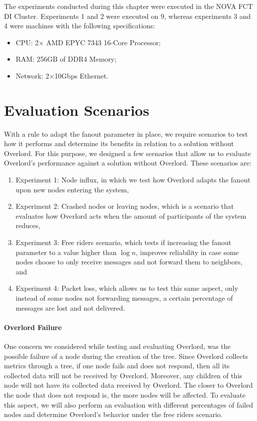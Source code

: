 The experiments conducted during this chapter were executed in the NOVA FCT DI Cluster. Experiments 1 and 2 were executed on 9, whereas experiments 3 and 4 were machines with the following specifications:
\begin{itemize}
    \item CPU: 2$\times$ AMD EPYC 7343 16-Core Processor;
    \item RAM: 256GB of DDR4 Memory;
    \item Network: 2$\times$10Gbps Ethernet.
\end{itemize}

\section{Evaluation Scenarios}
\label{sec:evaluation_scenarios}

With a rule to adapt the fanout parameter in place, we require scenarios to test how it performs and determine its benefits in relation to a solution without Overlord. For this purpose, we designed a few scenarios that allow us to evaluate Overlord's performance against a solution without Overlord. These scenarios are:
\begin{enumerate}[]
    \item Experiment 1: Node influx, in which we test how Overlord adapts the fanout upon new nodes entering the system,
    \item Experiment 2: Crashed nodes or leaving nodes, which is a scenario that evaluates how Overlord acts when the amount of participants of the system reduces,
    \item Experiment 3: Free riders scenario, which tests if increasing the fanout parameter to a value higher than $\log{n}$, improves reliability in case some nodes choose to only receive messages and not forward them to neighbors, and
    \item Experiment 4: Packet loss, which allows us to test this same aspect, only instead of some nodes not forwarding messages, a certain percentage of messages are lost and not delivered.
\end{enumerate}

\paragraph{Overlord Failure} One concern we considered while testing and evaluating Overlord, was the possible failure of a node during the creation of the tree. Since Overlord collects metrics through a tree, if one node fails and does not respond, then all its collected data will not be received by Overlord. Moreover, any children of this node will not have its collected data received by Overlord. The closer to Overlord the node that does not respond is, the more nodes will be affected. To evaluate this aspect, we will also perform an evaluation with different percentages of failed nodes and determine Overlord's behavior under the free riders scenario.


